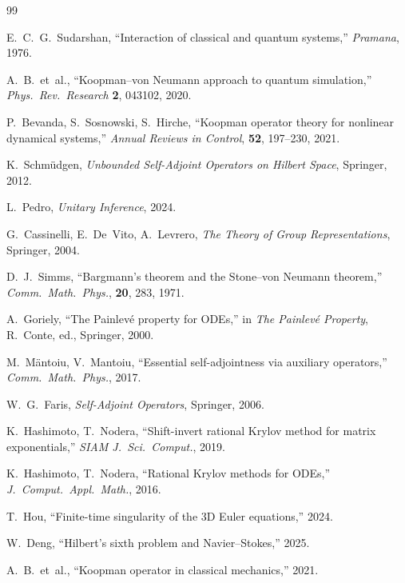 \documentclass[11pt,a4paper]{article}
\begin{document}
\begin{thebibliography}{99}

E.~C.~G.~Sudarshan, ``Interaction of classical and quantum systems,''
\textit{Pramana}, 1976.

A.~B.~et~al., ``Koopman--von Neumann approach to quantum simulation,''
\textit{Phys.\ Rev.\ Research} \textbf{2}, 043102, 2020.

P.~Bevanda, S.~Sosnowski, S.~Hirche, ``Koopman operator theory for
nonlinear dynamical systems,'' \textit{Annual Reviews in Control},
\textbf{52}, 197--230, 2021.

K.~Schm\"udgen, \textit{Unbounded Self-Adjoint Operators on Hilbert
Space}, Springer, 2012.

L.~Pedro, \textit{Unitary Inference}, 2024.

G.~Cassinelli, E.~De~Vito, A.~Levrero, \textit{The Theory of Group
Representations}, Springer, 2004.

D.~J.~Simms, ``Bargmann's theorem and the Stone--von Neumann
theorem,'' \textit{Comm.\ Math.\ Phys.}, \textbf{20}, 283, 1971.

A.~Goriely, ``The Painlev\'e property for ODEs,'' in \textit{The
Painlev\'e Property}, R.~Conte, ed., Springer, 2000.

M.~M\"antoiu, V.~Mantoiu, ``Essential self-adjointness via auxiliary
operators,'' \textit{Comm.\ Math.\ Phys.}, 2017.

W.~G.~Faris, \textit{Self-Adjoint Operators}, Springer, 2006.

K.~Hashimoto, T.~Nodera, ``Shift-invert rational Krylov method for
matrix exponentials,'' \textit{SIAM J.\ Sci.\ Comput.}, 2019.

K.~Hashimoto, T.~Nodera, ``Rational Krylov methods for ODEs,''
\textit{J.\ Comput.\ Appl.\ Math.}, 2016.

T.~Hou, ``Finite-time singularity of the 3D Euler equations,'' 2024.

W.~Deng, ``Hilbert's sixth problem and Navier--Stokes,'' 2025.

A.~B.~et~al., ``Koopman operator in classical mechanics,'' 2021.

\end{thebibliography}
\end{document}
